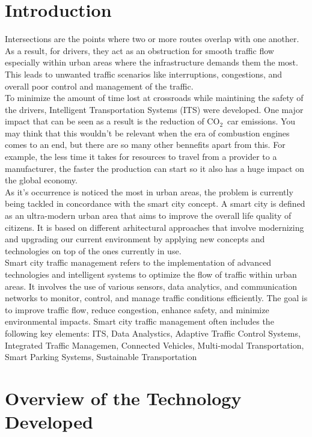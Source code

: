 \documentclass[17pt]{report}
\newcommand{\coo}{\ensuremath{\mathrm{CO_2}}}
\begin{document}
\chapter{Introduction}
\indent \indent
Intersections are the points where two or more
routes overlap with one another. As a result, for drivers, 
they act as an obstruction for smooth traffic
flow especially within urban areas where the
infrastructure demands them the most. This leads to unwanted 
traffic scenarios like interruptions, congestions, and
overall poor control and management of the traffic.\\
\indent \indent
To minimize the amount of time lost at crossroads while
maintining the safety of the drivers, Intelligent
Transportation Systems (ITS) were developed.
One major impact that can be seen as a result is the
reduction of \coo\ car emissions. You may think that
this wouldn't be relevant when the era of combustion
engines comes to an end, but there are so many other
bennefits apart from this. For example, the less time
it takes for resources to travel from a provider to a
manufacturer, the faster the production can start so
it also has a huge impact on the global economy.\\
\indent \indent
As it's occurrence is noticed the most in urban areas,
the problem is currently being tackled in concordance 
with the smart city concept. A smart city is defined as an
ultra-modern urban area that aims to improve the overall life
quality of citizens. It is based on different arhitectural
approaches that involve modernizing and upgrading our current 
environment by applying new concepts and technologies on top
of the ones currently in use.\\
\indent \indent
Smart city traffic management refers to the implementation of advanced
technologies and intelligent systems to optimize the flow of traffic within
urban areas. It involves the use of various sensors, data analytics,
and communication networks to monitor, control, and manage traffic conditions
efficiently. The goal is to improve traffic flow, reduce congestion, enhance safety,
and minimize environmental impacts. Smart city traffic management often includes
the following key elements: ITS, Data Analystics, Adaptive Traffic Control Systems,
Integrated Traffic Managemen, Connected Vehicles, Multi-modal Transportation,
Smart Parking Systems, Sustainable Transportation
\chapter{Overview of the Technology Developed}
\end{document}
